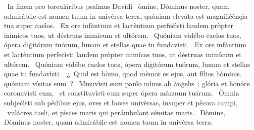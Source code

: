 {~In finem pro torculáribus psalmus Davídi}
{%
~òmine, Dòminus noster, quam admirábile est nomen tuum in univèrsa terra, quóniam eleváta est magnifiċènçia tua super ċaelos.
~Ex ore infàntium et lactèntium perfeċìsti laudem pròpter inimícos tuos, ut déstruas inimícum et ultórem.
~Quóniam vidébo ċaelos tuos, ópera diġitórum tuórum, lunam et stellas quae tu fundavìsti.
~Ex ore infàntium et lactèntium perfeċìsti laudem pròpter inimícos tuos, ut déstruas inimícum et ultórem.
~Quóniam vidébo ċaelos tuos, ópera diġitórum tuórum, lunam et stellas quae tu fundavìsti.
~¿~Quid est hòmo, quod mèmor es ejus, aut fílius hòminis, quóniam vísitas eum~?
~Minuvìsti eum paulo mìnus ab ànġelïs~; glória et honóre coronavìsti eum,
~et constituvìsti eum super ópera mànuum tuárum.
~Òmnia subjeċìsti sub pèdibus ejus, oves et boves univèrsas, ìnsuper et pècora campi,
~vulácres ċaeli, et pìsċes maris qui perámbulant sémitas maris.
~Dòmine, Dòminus noster, quam admirábile est nomen tuum in univèrsa terra.
}
